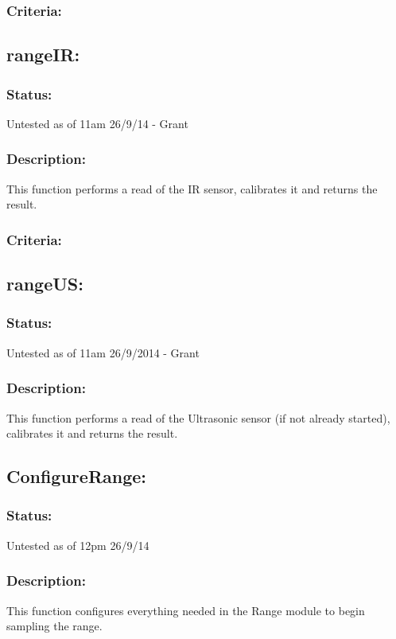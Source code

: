 \documentclass[]{article}
\begin{document}
\subsubsection{Criteria:}

\subsection{rangeIR:}
\subsubsection{Status:}
Untested as of 11am 26/9/14 - Grant

\subsubsection{Description:}
This function performs a read of the IR sensor, calibrates it and returns the result.

\subsubsection{Criteria:}

\subsection{rangeUS:}
\subsubsection{Status:}
Untested as of 11am 26/9/2014 - Grant

\subsubsection{Description:}
This function performs a read of the Ultrasonic sensor (if not already started), calibrates it and returns the result.

\subsection{ConfigureRange:}
\subsubsection{Status:}
Untested as of 12pm 26/9/14

\subsubsection{Description:}
This function configures everything needed in the Range module to begin sampling the range.
\end{document}
